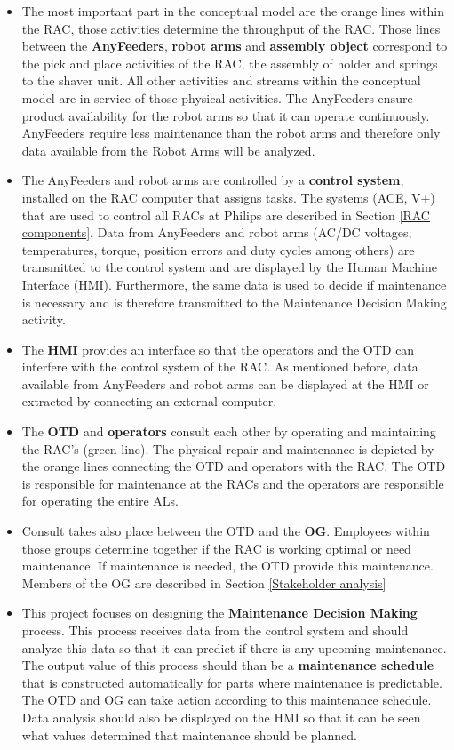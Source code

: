 \begin{itemize}
\item The most important part in the conceptual model are the orange lines within the RAC, those activities determine the throughput of the RAC. Those lines between the \textbf{AnyFeeders}, \textbf{robot arms} and \textbf{assembly object} correspond to the pick and place activities of the RAC, the assembly of holder and springs to the shaver unit. All other activities and streams within the conceptual model are in service of those physical activities. The AnyFeeders ensure product availability for the robot arms so that it can operate continuously. AnyFeeders require less maintenance than the robot arms and therefore only data available from the Robot Arms will be analyzed. 
\item The AnyFeeders and robot arms are controlled by a \textbf{control system}, installed on the RAC computer that assigns tasks. The systems (ACE, V+) that are used to control all RACs at Philips are described in Section \ref{RAC components}. Data from AnyFeeders and robot arms (AC/DC voltages, temperatures, torque, position errors and duty cycles among others) are transmitted to the control system and are displayed by the Human Machine Interface (HMI). Furthermore, the same data is used to decide if maintenance is necessary and is therefore transmitted to the Maintenance Decision Making activity.
\item The \textbf{HMI} provides an interface so that the operators and the OTD can interfere with the control system of the RAC. As mentioned before, data available from AnyFeeders and robot arms can be displayed at the HMI or extracted by connecting an external computer.
\item The \textbf{OTD} and \textbf{operators} consult each other by operating and maintaining the RAC's (green line). The physical repair and maintenance is depicted by the orange lines connecting the OTD and operators with the RAC. The OTD is responsible for maintenance at the RACs and the operators are responsible for operating the entire ALs.
\item Consult takes also place between the OTD and the \textbf{OG}. Employees within those groups determine together if the RAC is working optimal or need maintenance. If maintenance is needed, the OTD provide this maintenance. Members of the OG are described in Section \ref{Stakeholder analysis}
\item This project focuses on designing the \textbf{Maintenance Decision Making} process. This process receives data from the control system and should analyze this data so that it can predict if there is any upcoming maintenance. The output value of this process should than be a \textbf{maintenance schedule} that is constructed automatically for parts where maintenance is predictable. The OTD and OG can take action according to this maintenance schedule. Data analysis should also be displayed on the HMI so that it can be seen what values determined that maintenance should be planned.
\end{itemize} 

